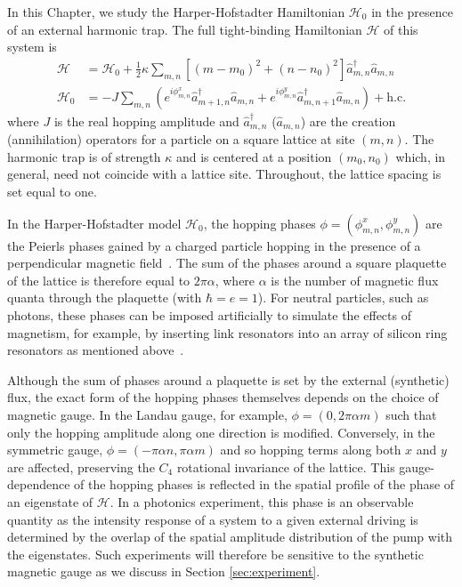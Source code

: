 In this Chapter, we study the Harper-Hofstadter Hamiltonian
$\mathcal{H}_0$ in the presence of an external harmonic trap. The full
tight-binding Hamiltonian $\mathcal{H}$ of this system is
%
\begin{align} \mathcal{H} &= \mathcal{H}_0+\frac{1}{2}\kappa
\sum_{m,n}\left[(m-m_0)^{2}+(n-n_0)^{2}\right]\hat{a}_{m,n}^{\dagger}\hat{a}_{m,n} \label{eq:model}\\
\mathcal{H}_0 &= -J\sum_{m,n}(e^{i
\phi_{m,n}^x}\hat{a}_{m+1,n}^{\dagger}\hat{a}_{m,n} +e^{i
\phi_{m,n}^y}\hat{a}_{m,n+1}^{\dagger}\hat{a}_{m,n}) +
\text{h.c.} \label{eq:hh_hamiltonian}
\end{align}
%
where $J$ is the real hopping amplitude and $\hat{a}_{m,n}^{\dagger}$
($\hat{a}_{m,n}$) are the creation (annihilation) operators for a
particle on a square lattice at site $(m,n)$. The harmonic trap is of
strength $\kappa$ and is centered at a position $(m_0, n_0)$ which, in
general, need not coincide with a lattice site. Throughout, the
lattice spacing is set equal to one.

In the Harper-Hofstadter model $\mathcal{H}_0$, the hopping phases
$\phi = (\phi_{m,n}^x, \phi_{m,n}^y)$ are the Peierls phases gained by
a charged particle hopping in the presence of a perpendicular magnetic
field~\cite{harper1955magnetic,hofstadter1976butterfly}. The sum of
the phases around a square plaquette of the lattice is therefore equal
to $2\pi\alpha$, where $\alpha$ is the number of magnetic flux quanta
through the plaquette (with $\hbar=e=1$). For neutral particles, such
as photons, these phases can be imposed artificially to simulate the
effects of magnetism, for example, by inserting link resonators into
an array of silicon ring resonators as mentioned
above~\cite{hafezi2013imaging}.

Although the sum of phases around a plaquette is set by the external
(synthetic) flux, the exact form of the hopping phases themselves
depends on the choice of magnetic gauge. In the Landau gauge, for
example, $\phi = (0, 2\pi\alpha m)$ such that only the hopping
amplitude along one direction is modified. Conversely, in the
symmetric gauge, $\phi = (-\pi\alpha n, \pi\alpha m)$ and so hopping
terms along both $x$ and $y$ are affected, preserving the $C_4$
rotational invariance of the lattice. This gauge-dependence of the
hopping phases is reflected in the spatial profile of the phase of an
eigenstate of $\mathcal{H}$. In a photonics experiment, this phase is
an observable quantity as the intensity response of a system to a
given external driving is determined by the overlap of the spatial
amplitude distribution of the pump with the eigenstates. Such
experiments will therefore be sensitive to the synthetic magnetic
gauge as we discuss in Section \ref{sec:experiment}.

